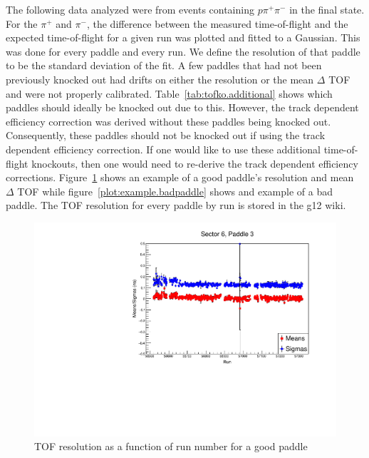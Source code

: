 \documentclass[ 12 pt]{article}
\begin{document}
\begin{itemize}
The following data analyzed were from events containing $p \pi^{+} \pi^{-}$ in the final state. For the $\pi^{+}$ and $\pi^{-}$, the difference between the measured time-of-flight and the expected time-of-flight for a given run was plotted and fitted to a Gaussian. This was done for every paddle and every run. We define the resolution of that paddle to be the standard deviation of the fit. A few paddles that had not been previously knocked out had drifts on either the resolution or the mean $\Delta$ TOF and were not properly calibrated. Table~\ref{tab:tofko.additional} shows which paddles should ideally be knocked out due to this. However, the track dependent efficiency correction was derived without these paddles being knocked out. Consequently, these paddles should not be knocked out if using the track dependent efficiency correction. If one would like to use these additional time-of-flight knockouts, then one would need to re-derive the track dependent efficiency corrections. Figure~\ref{plot:example.goodpaddle} shows an example of a good paddle's resolution and mean $\Delta$ TOF while figure~\ref{plot:example.badpaddle} shows and example of a bad paddle. The TOF resolution for every paddle by run is stored in the g12 wiki.


\begin{figure}\begin{center}
      \includegraphics[width=0.95\columnwidth]{figures/calib/tof/goodexample.pdf}
   \caption{\label{plot:example.goodpaddle}TOF resolution as a function of run number for a good paddle}
\end{center}\end{figure}


\end{itemize}
\end{document}

